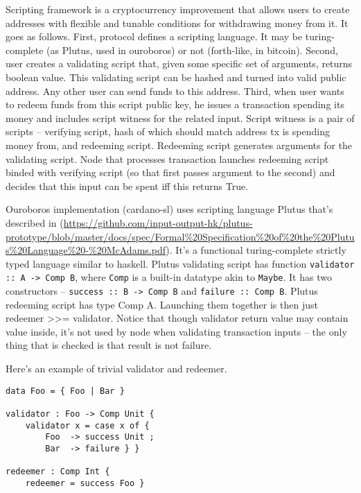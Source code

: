 \documentclass[]{itmo-student-thesis}
\begin{document}
Scripting framework is a cryptocurrency improvement that allows users
to create addresses with flexible and tunable conditions for
withdrawing money from it. It goes as follows. First, protocol defines
a scripting language. It may be turing-complete (as Plutus, used in
ouroboros) or not (forth-like, in bitcoin). Second, user creates a
validating script that, given some specific set of arguments, returns
boolean value. This validating script can be hashed and turned into
valid public address. Any other user can send funds to this
address. Third, when user wants to redeem funds from this script
public key, he issues a transaction spending its money and includes
script witness for the related input. Script witness is a pair of
scripts -- verifying script, hash of which should match address tx is
spending money from, and redeeming script. Redeeming script generates
arguments for the validating script. Node that processes transaction
launches redeeming script binded with verifying script (so that first
passes argument to the second) and decides that this input can be
spent iff this returns True.

Ouroboros implementation (cardano-sl) uses scripting language Plutus
that’s described in
(\url{https://github.com/input-output-hk/plutus-prototype/blob/master/docs/spec/Formal\%20Specification\%20of\%20the\%20Plutus\%20Language\%20-\%20McAdams.pdf}). It’s
a functional turing-complete strictly typed language similar to
haskell. Plutus validating script has function \lstinline|validator :: A -> Comp B|,
where \lstinline|Comp| is a built-in datatype akin to
\lstinline|Maybe|. It has two constructors -- \lstinline|success :: B -> Comp B|
and \lstinline|failure :: Comp B|. Plutus redeeming script
has type Comp A. Launching them together is then just redeemer >>=
validator. Notice that though validator return value may contain value
inside, it’s not used by node when validating transaction inputs --
the only thing that is checked is that result is not failure.

Here’s an example of trivial validator and redeemer.

\begin{lstlisting}[float=!h,caption={Пример исходного кода на Java}]
data Foo = { Foo | Bar }

validator : Foo -> Comp Unit {
    validator x = case x of {
        Foo  -> success Unit ;
        Bar  -> failure } }

redeemer : Comp Int {
    redeemer = success Foo }
\end{lstlisting}
\end{document}
